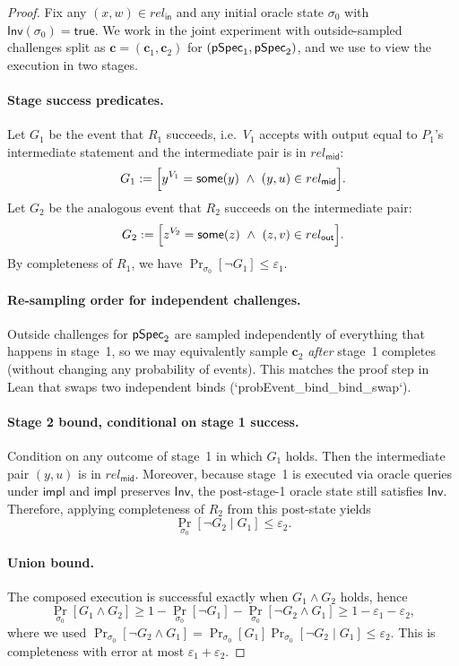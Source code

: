 \begin{proof}
Fix any $(x,w)\in rel_{\mathsf{in}}$ and any initial oracle state $\sigma_0$ with
$\mathsf{Inv}(\sigma_0)=\mathsf{true}$. We work in the joint experiment with outside-sampled
challenges split as $\mathbf{c}=(\mathbf{c}_1,\mathbf{c}_2)$ for $(\mathsf{pSpec}_1,\mathsf{pSpec}_2)$, and we use
 to view the execution in two stages.

\paragraph{Stage success predicates.}
Let $G_1$ be the event that $R_1$ succeeds, i.e.\ $V_1$ accepts with output equal to $P_1$'s
intermediate statement and the intermediate pair is in $rel_{\mathsf{mid}}$:
\[
  G_1 \mathrel{:=}
  \Bigl[
    y^{V_1} = \mathsf{some}(y)
    \ \wedge\ (y,u) \in rel_{\mathsf{mid}}
  \Bigr].
\]
Let $G_2$ be the analogous event that $R_2$ succeeds on the intermediate pair:
\[
  G_2 \mathrel{:=}
  \Bigl[
    z^{V_2} = \mathsf{some}(z)
    \ \wedge\ (z,v) \in rel_{\mathsf{out}}
  \Bigr].
\]
By completeness of $R_1$, we have $\Pr_{\sigma_0}[\neg G_1]\le \varepsilon_1$.

\paragraph{Re-sampling order for independent challenges.}
Outside challenges for $\mathsf{pSpec}_2$ are sampled independently of everything that happens in stage~1,
so we may equivalently sample $\mathbf{c}_2$ \emph{after} stage~1 completes (without changing any
probability of events). This matches the proof step in Lean that swaps two independent binds
(`probEvent_bind_bind_swap`).

\paragraph{Stage 2 bound, conditional on stage 1 success.}
Condition on any outcome of stage~1 in which $G_1$ holds. Then the intermediate pair $(y,u)$ is in
$rel_{\mathsf{mid}}$. Moreover, because stage~1 is executed via oracle queries under $\mathsf{impl}$
and $\mathsf{impl}$ preserves $\mathsf{Inv}$, the post-stage-1 oracle state still satisfies
$\mathsf{Inv}$. Therefore, applying completeness of $R_2$ from this post-state yields
\[
  \Pr_{\sigma_0}[\neg G_2 \mid G_1] \le \varepsilon_2.
\]

\paragraph{Union bound.}
The composed execution is successful exactly when $G_1 \wedge G_2$ holds, hence
\[
  \Pr_{\sigma_0}[G_1 \wedge G_2]
  \ge 1 - \Pr_{\sigma_0}[\neg G_1] - \Pr_{\sigma_0}[\neg G_2 \wedge G_1]
  \ge 1 - \varepsilon_1 - \varepsilon_2,
\]
where we used $\Pr_{\sigma_0}[\neg G_2 \wedge G_1]=\Pr_{\sigma_0}[G_1]\Pr_{\sigma_0}[\neg G_2\mid G_1]
\le \varepsilon_2$. This is completeness with error at most $\varepsilon_1+\varepsilon_2$.
\end{proof}

